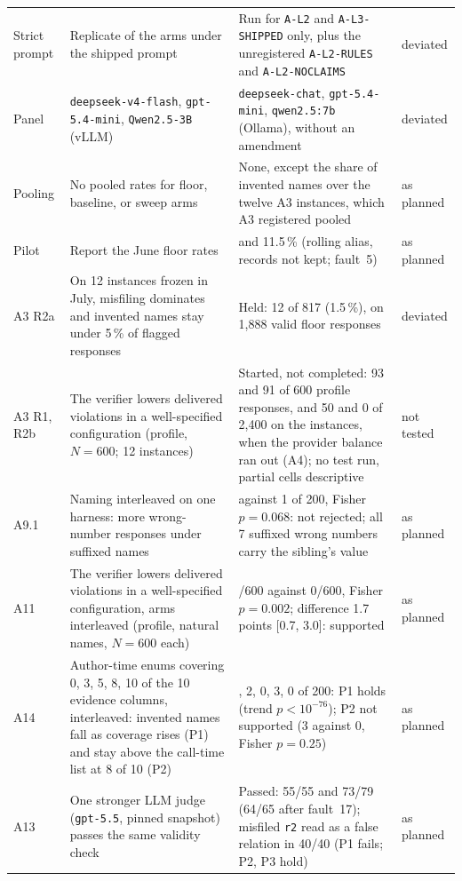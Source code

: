 \documentclass[smallextended,natbib]{svjour3}
\begin{document}
{\begin{longtable}{@{}l>{\raggedright\arraybackslash}p{3.2cm}>{\raggedright\arraybackslash}p{4.85cm}l@{}}
Strict prompt & Replicate of the arms under the shipped prompt & Run for \texttt{A-L2} and \texttt{A-L3-SHIPPED} only, plus the unregistered \texttt{A-L2-RULES} and \texttt{A-L2-NOCLAIMS} & deviated \\
Panel & \texttt{deepseek-v4-flash}, \texttt{gpt-5.4-mini}, \texttt{Qwen2.5-3B} (vLLM) & \texttt{deepseek-chat}, \texttt{gpt-5.4-mini}, \texttt{qwen2.5:7b} (Ollama), without an amendment & deviated \\
Pooling & No pooled rates for floor, baseline, or sweep arms & None, except the share of invented names over the twelve A3 instances, which A3 registered pooled & as planned \\
Pilot & Report the June floor rates & 15.0 and 11.5\,\% (rolling alias, records not kept; fault~5) & as planned \\
\midrule
A3 R2a & On 12 instances frozen in July, misfiling dominates and invented names stay under 5\,\% of flagged responses & Held: 12 of 817 (1.5\,\%), on 1{,}888 valid floor responses & deviated \\
A3 R1, R2b & The verifier lowers delivered violations in a well-specified configuration (profile, $N=600$; 12 instances) & Started, not completed: 93 and 91 of 600 profile responses, and 50 and 0 of 2{,}400 on the instances, when the provider balance ran out (A4); no test run, partial cells descriptive & not tested \\
A9.1 & Naming interleaved on one harness: more wrong-number responses under suffixed names & 7 against 1 of 200, Fisher $p=0.068$: not rejected; all 7 suffixed wrong numbers carry the sibling's value & as planned \\
A11 & The verifier lowers delivered violations in a well-specified configuration, arms interleaved (profile, natural names, $N=600$ each) & 10/600 against 0/600, Fisher $p=0.002$; difference 1.7 points [0.7, 3.0]: supported & as planned \\
A14 & Author-time enums covering 0, 3, 5, 8, 10 of the 10 evidence columns, interleaved: invented names fall as coverage rises (P1) and stay above the call-time list at 8 of 10 (P2) & 143, 2, 0, 3, 0 of 200: P1 holds (trend $p<10^{-76}$); P2 not supported (3 against 0, Fisher $p=0.25$) & as planned \\
A13 & One stronger LLM judge (\texttt{gpt-5.5}, pinned snapshot) passes the same validity check & Passed: 55/55 and 73/79 (64/65 after fault~17); misfiled \texttt{r2} read as a false relation in 40/40 (P1 fails; P2, P3 hold) & as planned \\
\end{longtable}}
\end{document}
